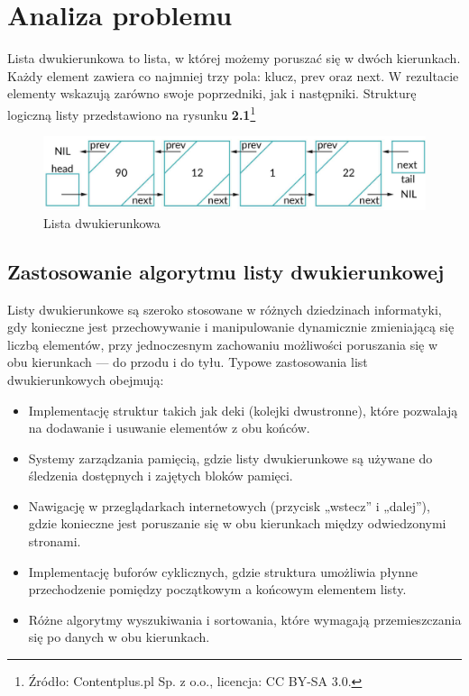 \newpage
\section{Analiza problemu}		%
\hspace{0.60cm}
Lista dwukierunkowa to lista, w której możemy poruszać się w dwóch kierunkach.
Każdy element zawiera co najmniej trzy pola: klucz, prev oraz next. W rezultacie
elementy wskazują zarówno swoje poprzedniki, jak i następniki. Strukturę logiczną listy przedstawiono na rysunku
\textbf{2.1}\footnote{Źródło: Contentplus.pl Sp. z o.o., licencja: CC BY-SA 3.0.}

\begin{figure}[!htb]
  \begin{center}
    \includegraphics[width=\textwidth]{rys/lista-dwukierunkowa.png}
    \caption{Lista dwukierunkowa}\label{rys:lista_dwukierunkowa}
  \end{center}
\end{figure}

\subsection{Zastosowanie algorytmu listy dwukierunkowej\cite{ZPE}}

Listy dwukierunkowe są szeroko stosowane w różnych dziedzinach informatyki, gdy konieczne jest przechowywanie i manipulowanie dynamicznie zmieniającą się liczbą elementów, przy jednoczesnym zachowaniu możliwości poruszania się w obu kierunkach — do przodu i do tyłu. Typowe zastosowania list dwukierunkowych obejmują:

\begin{itemize}
  \item Implementację struktur takich jak deki (kolejki dwustronne), które pozwalają na dodawanie i usuwanie elementów z obu końców.
  \item Systemy zarządzania pamięcią, gdzie listy dwukierunkowe są używane do śledzenia dostępnych i zajętych bloków pamięci.
  \item Nawigację w przeglądarkach internetowych (przycisk „wstecz” i „dalej”), gdzie konieczne jest poruszanie się w obu kierunkach między odwiedzonymi stronami.
  \item Implementację buforów cyklicznych, gdzie struktura umożliwia płynne przechodzenie pomiędzy początkowym a końcowym elementem listy.
  \item Różne algorytmy wyszukiwania i sortowania, które wymagają przemieszczania się po danych w obu kierunkach.
\end{itemize}

